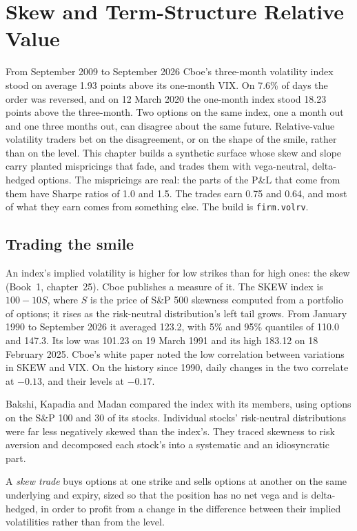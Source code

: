 \chapter{Skew and Term-Structure Relative Value}\label{ch:s2:skew-and-term-structure-relative-value}

From September 2009 to September 2026 Cboe's three-month volatility index stood on average 1.93 points above its one-month VIX. On 7.6\% of days the
order was reversed, and on 12 March 2020 the one-month index stood 18.23 points above the three-month. Two options on the same index, one a month out
and one three months out, can disagree about the same future. Relative-value volatility traders bet on the disagreement, or on the shape of the smile,
rather than on the level. This chapter builds a synthetic surface whose skew and slope carry planted mispricings that fade, and trades them with
vega-neutral, delta-hedged options. The mispricings are real: the parts of the P\&L that come from them have Sharpe ratios of 1.0 and 1.5. The trades
earn 0.75 and 0.64, and most of what they earn comes from something else. The build is \texttt{firm.volrv}.

\section{Trading the smile}

An index's implied volatility is higher for low strikes than for high ones: the skew (Book~1, chapter~25). Cboe publishes a measure of it. The SKEW
index is $100 - 10S$, where $S$ is the price of S\&P 500 skewness computed from a portfolio of options; it rises as the risk-neutral distribution's
left tail grows. From January 1990 to September 2026 it averaged 123.2, with 5\% and 95\% quantiles of 110.0 and 147.3. Its low was 101.23 on 19 March
1991 and its high 183.12 on 18 February 2025. Cboe's white paper noted the low correlation between variations in SKEW and VIX. On the history since
1990, daily changes in the two correlate at $-0.13$, and their levels at $-0.17$.

Bakshi, Kapadia and Madan compared the index with its members, using options on the S\&P 100 and 30 of its stocks. Individual stocks' risk-neutral
distributions were far less negatively skewed than the index's. They traced skewness to risk aversion and decomposed each stock's into a systematic
and an idiosyncratic part.

\begin{definition}\label{def:s2:skew-and-term-structure-relative-value:skew}
A \emph{skew trade} buys options at one strike and sells options at another on the same underlying and expiry, sized so that the
position has no net vega and is delta-hedged, in order to profit from a change in the difference between their implied volatilities rather than from
the level.
\end{definition}

